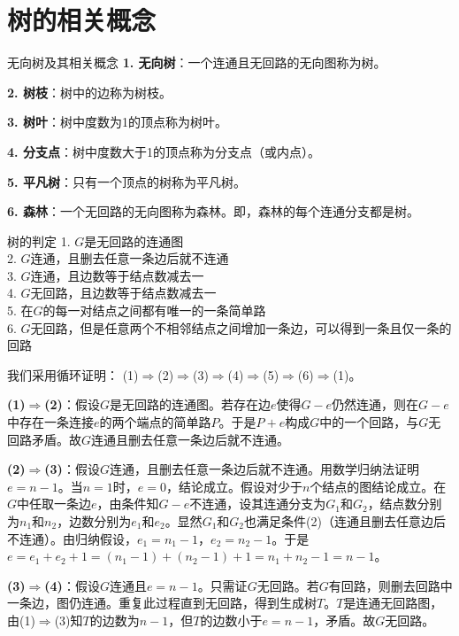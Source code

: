 \section{树的相关概念}
\begin{definition}{无向树及其相关概念}{}
    \textbf{1. 无向树}：一个连通且无回路的无向图称为树。

    \textbf{2. 树枝}：树中的边称为树枝。

    \textbf{3. 树叶}：树中度数为1的顶点称为树叶。

    \textbf{4. 分支点}：树中度数大于1的顶点称为分支点（或内点）。

    \textbf{5. 平凡树}：只有一个顶点的树称为平凡树。

    \textbf{6. 森林}：一个无回路的无向图称为森林。即，森林的每个连通分支都是树。
\end{definition}
\begin{theorem}{树的判定}{}
    1. $G$是无回路的连通图\\
    2. $G$连通，且删去任意一条边后就不连通\\
    3. $G$连通，且边数等于结点数减去一\\
    4. $G$无回路，且边数等于结点数减去一\\
    5. 在$G$的每一对结点之间都有唯一的一条简单路\\
    6. $G$无回路，但是任意两个不相邻结点之间增加一条边，可以得到一条且仅一条的回路
\end{theorem}
我们采用循环证明：
(1)$\Rightarrow$(2)$\Rightarrow$(3)$\Rightarrow$(4)$\Rightarrow$(5)$\Rightarrow$(6)$\Rightarrow$(1)。

\textbf{(1)$\Rightarrow$(2)}：假设$G$是无回路的连通图。若存在边$e$使得$G-e$仍然连通，则在$G-e$中存在一条连接$e$的两个端点的简单路$P$。于是$P+e$构成$G$中的一个回路，与$G$无回路矛盾。故$G$连通且删去任意一条边后就不连通。

\textbf{(2)$\Rightarrow$(3)}：假设$G$连通，且删去任意一条边后就不连通。用数学归纳法证明$e=n-1$。当$n=1$时，$e=0$，结论成立。假设对少于$n$个结点的图结论成立。在$G$中任取一条边$e$，由条件知$G-e$不连通，设其连通分支为$G_1$和$G_2$，结点数分别为$n_1$和$n_2$，边数分别为$e_1$和$e_2$。显然$G_1$和$G_2$也满足条件(2)（连通且删去任意边后不连通）。由归纳假设，$e_1=n_1-1$，$e_2=n_2-1$。于是$e=e_1+e_2+1=(n_1-1)+(n_2-1)+1=n_1+n_2-1=n-1$。

\textbf{(3)$\Rightarrow$(4)}：假设$G$连通且$e=n-1$。只需证$G$无回路。若$G$有回路，则删去回路中一条边，图仍连通。重复此过程直到无回路，得到生成树$T$。$T$是连通无回路图，由(1)$\Rightarrow$(3)知$T$的边数为$n-1$，但$T$的边数小于$e=n-1$，矛盾。故$G$无回路。


